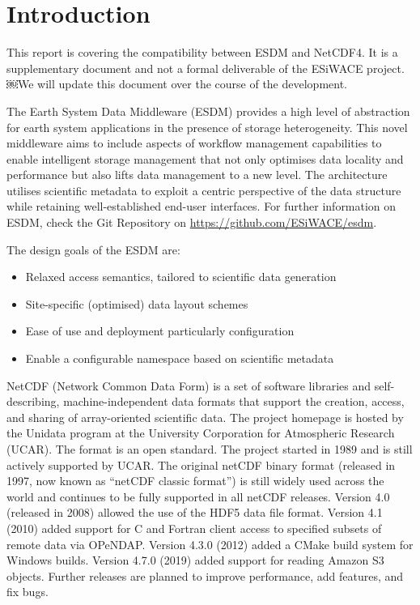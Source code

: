 \chapter{Introduction}
\label{ch:intro}

\tab
This report is covering the compatibility between ESDM and NetCDF4.
It is a supplementary document and not a formal deliverable of the ESiWACE project.
￼We will update this document over the course of the development.

The Earth System Data Middleware (ESDM) provides a high level of abstraction for earth system applications in the presence of storage heterogeneity. This novel middleware aims to include aspects of workflow management capabilities to enable intelligent storage management that not only optimises data locality and performance but also lifts data management to a new level. The architecture utilises scientific metadata to exploit a centric perspective of the data structure while retaining well-established end-user interfaces. For further information on ESDM, check the Git Repository on \url{https://github.com/ESiWACE/esdm}.

The design goals of the ESDM are:

\begin{itemize}

\item Relaxed access semantics, tailored to scientific data generation

\item Site-specific (optimised) data layout schemes

\item Ease of use and deployment particularly configuration

\item Enable a configurable namespace based on scientific metadata

\end{itemize}

NetCDF (Network Common Data Form) is a set of software libraries and self-describing, machine-independent data formats that support the creation, access, and sharing of array-oriented scientific data. The project homepage is hosted by the Unidata program at the University Corporation for Atmospheric Research (UCAR). The format is an open standard. The project started in 1989 and is still actively supported by UCAR. The original netCDF binary format (released in 1997, now known as ``netCDF classic format'') is still widely used across the world and continues to be fully supported in all netCDF releases. Version 4.0 (released in 2008) allowed the use of the HDF5 data file format. Version 4.1 (2010) added support for C and Fortran client access to specified subsets of remote data via OPeNDAP. Version 4.3.0 (2012) added a CMake build system for Windows builds. Version 4.7.0 (2019) added support for reading Amazon S3 objects. Further releases are planned to improve performance, add features, and fix bugs.

